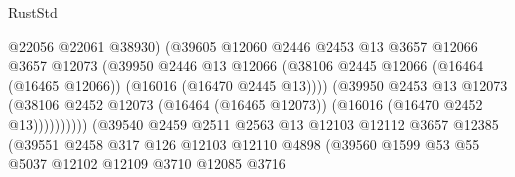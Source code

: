 \begin{lexlean}{RustStd}
\begin{coremodule}
                                          @22056
                                          @22061
                                          @38930)
                                        (@39605
                                          @12060
                                          @2446
                                          @2453
                                          @13
                                          @3657
                                          @12066
                                          @3657
                                          @12073
                                          (@39950
                                            @2446
                                            @13
                                            @12066
                                            (@38106
                                              @2445
                                              @12066
                                              (@16464 (@16465 @12066))
                                              (@16016 (@16470 @2445 @13))))
                                          (@39950
                                            @2453
                                            @13
                                            @12073
                                            (@38106
                                              @2452
                                              @12073
                                              (@16464 (@16465 @12073))
                                              (@16016 (@16470 @2452 @13))))))))))
                              (@39540
                                @2459
                                @2511
                                @2563
                                @13
                                @12103
                                @12112
                                @3657
                                @12385
                                (@39551
                                  @2458
                                  @317
                                  @126
                                  @12103
                                  @12110
                                  @4898
                                  (@39560
                                    @1599
                                    @53
                                    @55
                                    @5037
                                    @12102
                                    @12109
                                    @3710
                                    @12085
                                    @3716

\end{coremodule}
\end{lexlean}
